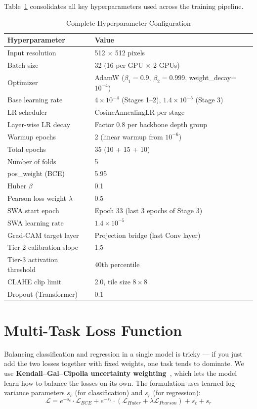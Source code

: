 \documentclass[12pt]{report}
\begin{document}
Table~\ref{tab:hyperparams} consolidates all key hyperparameters used across the training pipeline.

\begin{table}[H]
\centering
\caption{Complete Hyperparameter Configuration}
\label{tab:hyperparams}
\small
\renewcommand{\arraystretch}{1.2}
\begin{tabular}{|l|l|}
\hline
\textbf{Hyperparameter} & \textbf{Value} \\
\hline
Input resolution & 512 $\times$ 512 pixels \\
Batch size & 32 (16 per GPU $\times$ 2 GPUs) \\
Optimizer & AdamW ($\beta_1=0.9$, $\beta_2=0.999$, weight\_decay=$10^{-4}$) \\
Base learning rate & $4 \times 10^{-4}$ (Stages 1--2), $1.4 \times 10^{-5}$ (Stage 3) \\
LR scheduler & CosineAnnealingLR per stage \\
Layer-wise LR decay & Factor 0.8 per backbone depth group \\
Warmup epochs & 2 (linear warmup from $10^{-6}$) \\
Total epochs & 35 (10 + 15 + 10) \\
Number of folds & 5 \\
pos\_weight (BCE) & 5.95 \\
Huber $\beta$ & 0.1 \\
Pearson loss weight $\lambda$ & 0.5 \\
SWA start epoch & Epoch 33 (last 3 epochs of Stage 3) \\
SWA learning rate & $1.4 \times 10^{-5}$ \\
Grad-CAM target layer & Projection bridge (last Conv layer) \\
Tier-2 calibration slope & 1.5 \\
Tier-3 activation threshold & 40th percentile \\
CLAHE clip limit & 2.0, tile size $8 \times 8$ \\
Dropout (Transformer) & 0.1 \\
\hline
\end{tabular}
\end{table}

\section{Multi-Task Loss Function}

Balancing classification and regression in a single model is tricky --- if you just add the two losses together with fixed weights, one task tends to dominate. We use \textbf{Kendall--Gal--Cipolla uncertainty weighting}~\cite{ref3}, which lets the model learn how to balance the losses on its own. The formulation uses learned log-variance parameters $s_c$ (for classification) and $s_r$ (for regression):
\begin{equation}
\mathcal{L} = e^{-s_c} \cdot \mathcal{L}_{BCE} + e^{-s_r} \cdot (\mathcal{L}_{Huber} + \lambda \mathcal{L}_{Pearson}) + s_c + s_r
\end{equation}
\end{document}
